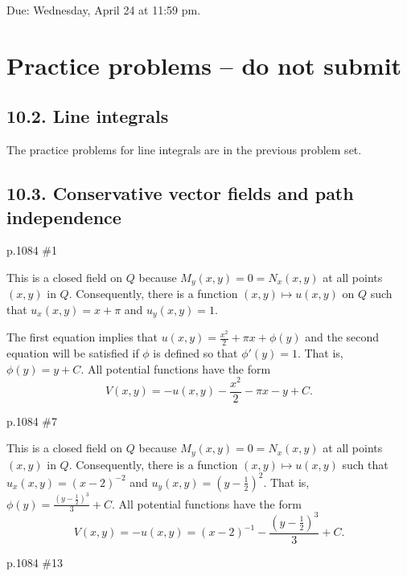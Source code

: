 \maketitle

Due: Wednesday, April 24 at 11:59 pm.

\section{Practice problems -- do not submit}
\subsection{10.2. Line integrals}
The practice problems for line integrals are in the previous problem set.

\subsection{10.3. Conservative vector fields and path independence}
\begin{practice}p.1084 \#1\end{practice}
\begin{pracsol}
  This is a closed field on $Q$ because $M_y(x,y)=0=N_x(x,y)$ at all points $(x,y)$ in $Q$. Consequently, there is a function $(x,y)\mapsto u(x,y)$ on $Q$ such that $u_x(x,y)=x+\pi$ and $u_y(x,y)=1$.

  The first equation implies that $u(x,y)=\frac{x^2}{2}+\pi x+\phi(y)$ and the second equation will be satisfied if $\phi$ is defined so that $\phi'(y)=1$. That is, $\phi(y)=y+C$. All potential functions have the form
  \[V(x,y)=-u(x,y)-\frac{x^2}{2}-\pi x-y+C.\]
\end{pracsol}
\begin{practice}p.1084 \#7\end{practice}
\begin{pracsol}
  This is a closed field on $Q$ because $M_y(x,y)=0=N_x(x,y)$ at all points $(x,y)$ in $Q$. Consequently, there is a function $(x,y)\mapsto u(x,y)$ such that $u_x(x,y)=(x-2)^{-2}$ and $u_y(x,y)=\left(y-\frac12\right)^2$. That is, $\phi(y)=\frac{\left(y-\frac12\right)^3}{3}+C$. All potential functions have the form
  \[V(x,y)=-u(x,y)=(x-2)^{-1}-\frac{\left(y-\frac12\right)^3}{3}+C.\]
\end{pracsol}
\begin{practice}p.1084 \#13\end{practice}

